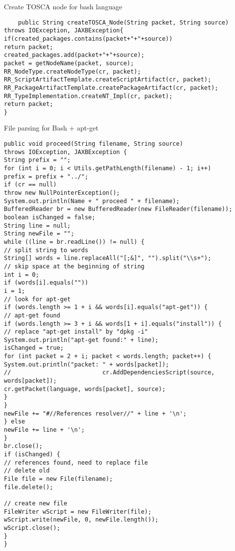 \begin{Listing}
\caption{Create TOSCA node for bash language}
\label{lst:create_bash}
\begin{lstlisting}
	public String createTOSCA_Node(String packet, String source) throws IOException, JAXBException{
if(created_packages.contains(packet+"+"+source))
return packet;
created_packages.add(packet+"+"+source);
packet = getNodeName(packet, source);
RR_NodeType.createNodeType(cr, packet);
RR_ScriptArtifactTemplate.createScriptArtifact(cr, packet);
RR_PackageArtifactTemplate.createPackageArtifact(cr, packet);
RR_TypeImplementation.createNT_Impl(cr, packet);
return packet;
}
\end{lstlisting}
\end{Listing}


\begin{Listing}
\caption{File parsing for Bash + apt-get }
\label{lst:bash_apt_parse}
\begin{lstlisting}
public void proceed(String filename, String source)
throws IOException, JAXBException {
String prefix = "";
for (int i = 0; i < Utils.getPathLength(filename) - 1; i++)
prefix = prefix + "../";
if (cr == null)
throw new NullPointerException();
System.out.println(Name + " proceed " + filename);
BufferedReader br = new BufferedReader(new FileReader(filename));
boolean isChanged = false;
String line = null;
String newFile = "";
while ((line = br.readLine()) != null) {
// split string to words
String[] words = line.replaceAll("[;&]", "").split("\\s+");
// skip space at the beginning of string
int i = 0;
if (words[i].equals(""))
i = 1;
// look for apt-get
if (words.length >= 1 + i && words[i].equals("apt-get")) {
// apt-get found
if (words.length >= 3 + i && words[1 + i].equals("install")) {
// replace "apt-get install" by "dpkg -i"
System.out.println("apt-get found:" + line);
isChanged = true;
for (int packet = 2 + i; packet < words.length; packet++) {
System.out.println("packet: " + words[packet]);
//							cr.AddDependenciesScript(source, words[packet]);
cr.getPacket(language, words[packet], source);
}
}
newFile += "#//References resolver//" + line + '\n';
} else
newFile += line + '\n';
}
br.close();
if (isChanged) {
// references found, need to replace file
// delete old
File file = new File(filename);
file.delete();

// create new file
FileWriter wScript = new FileWriter(file);
wScript.write(newFile, 0, newFile.length());
wScript.close();
}
}
\end{lstlisting}
\end{Listing}

